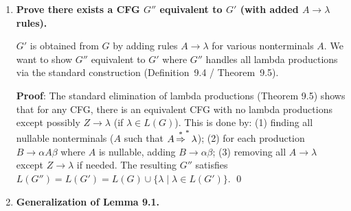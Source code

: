 \begin{enumerate}[{9.}1. ]
\begin{enumerate}
$S_3 \to S_3\pmb{e} \mid ?$ --- there's no base case for $S_3$ given. Assuming $S_3$ should have a base; looking at $S_1 \to \pmb{d}S_3$, $S_3$ appears only through $S_3 \to S_3\pmb{e}$, which is left-recursive with no base. This may indicate $L(S_3) = \emptyset$ unless there is a missing production. Assuming the grammar is as given and we treat $S_3 \to S_3\pmb{e}$ as the only rule for $S_3$: $S_3$ generates no terminal strings (left-recursive with no base). Then $S_1 \to \pmb{d}S_3$ generates nothing. So we focus on $S_1 \to S_1 S_2\pmb{c} \mid \pmb{d}S_3$ (empty) and $S_2 \to S_1 S_1 \mid \pmb{a}$.

For the left-recursive part: $S_1 \to S_1 S_2\pmb{c} \mid \pmb{d}S_3$ (taking $S_3$ as non-empty via some additional rule like $S_3 \to \pmb{d}$):
If $S_3 \to \pmb{d}$ (assumed), then $S_1 \to \pmb{d}S_3 \to \pmb{dd}$ and $S_1 \to S_1 S_2\pmb{c}$.
Eliminate left recursion: $S_1 \to \pmb{dd}S_1'$, $S_1' \to S_2\pmb{c}S_1' \mid \lambda$.
Substitute $S_2 \to S_1 S_1 \mid \pmb{a}$:
$S_1' \to S_1 S_1\pmb{c}S_1' \mid \pmb{a}\pmb{c}S_1' \mid \pmb{ac} \mid \ldots$
Continue substituting to get GNF; each step replaces leading nonterminals with their GNF expansions.
\end{enumerate}

\item \textbf{Prove there exists a CFG $G''$ equivalent to $G'$ (with added $A\to\lambda$ rules).}

$G'$ is obtained from $G$ by adding rules $A \to \lambda$ for various nonterminals $A$. We want to show $G''$ equivalent to $G'$ where $G''$ handles all lambda productions via the standard construction (Definition~9.4 / Theorem~9.5).

\textbf{Proof}: The standard elimination of lambda productions (Theorem 9.5) shows that for any CFG, there is an equivalent CFG with no lambda productions except possibly $Z \to \lambda$ (if $\lambda \in L(G)$). This is done by: (1) finding all nullable nonterminals ($A$ such that $A \operatorname{\overset{*}{\Rightarrow}}^* \lambda$); (2) for each production $B \to \alpha A \beta$ where $A$ is nullable, adding $B \to \alpha\beta$; (3) removing all $A \to \lambda$ except $Z \to \lambda$ if needed. The resulting $G''$ satisfies $L(G'') = L(G') = L(G) \cup \{\lambda \mid \lambda \in L(G')\}$. \qed

\item \textbf{Generalization of Lemma 9.1.}


\end{enumerate}
